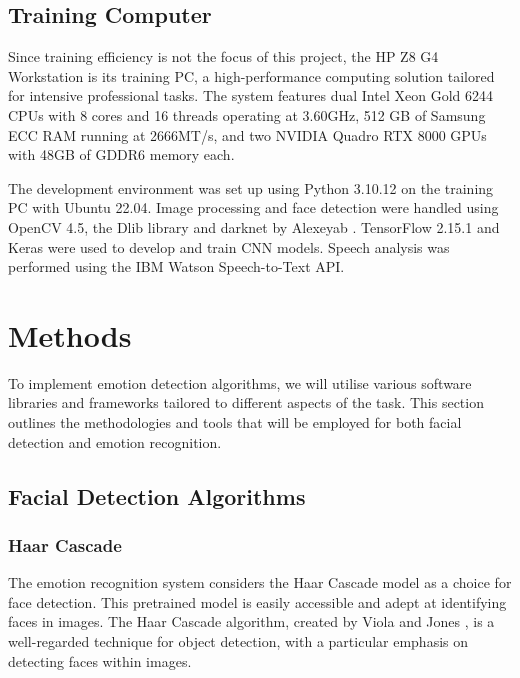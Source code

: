 \subsection{Training Computer}

Since training efficiency is not the focus of this project, the HP Z8 G4 Workstation is its training PC, a high-performance computing solution tailored for intensive professional tasks. The system features dual Intel Xeon Gold 6244 CPUs with 8 cores and 16 threads operating at 3.60GHz, 512 GB of Samsung ECC RAM running at 2666MT/s, and two NVIDIA Quadro RTX 8000 GPUs with 48GB of GDDR6 memory each.

The development environment was set up using Python 3.10.12 on the training PC with Ubuntu 22.04. Image processing and face detection were handled using OpenCV 4.5, the Dlib library and darknet by Alexeyab \cite{Alexey_2021-lf}. TensorFlow 2.15.1 and Keras were used to develop and train CNN models. Speech analysis was performed using the IBM Watson Speech-to-Text API.

\section{Methods}

To implement emotion detection algorithms, we will utilise various software libraries and frameworks tailored to different aspects of the task. This section outlines the methodologies and tools that will be employed for both facial detection and emotion recognition.
\subsection{Facial Detection Algorithms}

\subsubsection{Haar Cascade}

The emotion recognition system considers the Haar Cascade model as a choice for face detection. This pretrained model is easily accessible and adept at identifying faces in images. The Haar Cascade algorithm, created by Viola and Jones \cite{Viola990517}, is a well-regarded technique for object detection, with a particular emphasis on detecting faces within images.

